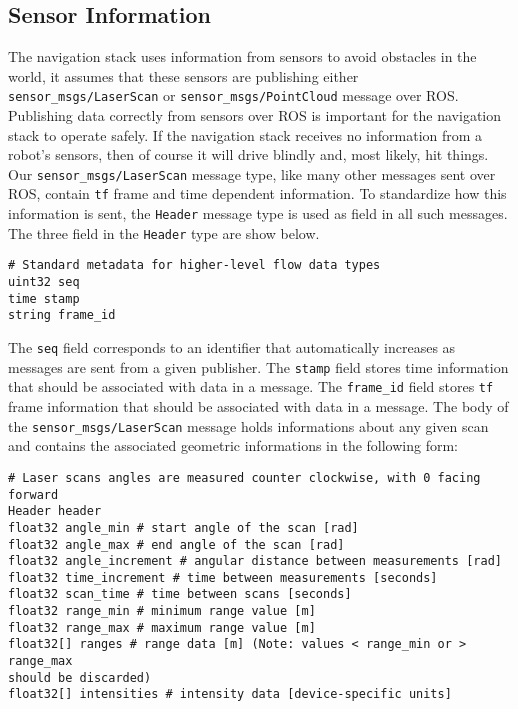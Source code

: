 \subsection*{Sensor Information}
The navigation stack uses information from sensors to avoid obstacles in the world,
it assumes that these sensors are publishing either \texttt{sensor\_msgs/LaserScan}
or \texttt{sensor\_msgs/PointCloud} message over ROS.
Publishing data correctly from sensors over ROS is important for the
navigation stack to operate safely. If the navigation stack receives no information
from a robot’s sensors, then of course it will drive blindly and, most
likely, hit things.
Our \texttt{sensor\_msgs/LaserScan} message type, like many other messages sent 
over ROS, contain \texttt{tf} frame and time dependent information. To standardize 
how this information is sent, the \texttt{Header} message type is used as field
in all such messages.
The three field in the \texttt{Header} type are show below.
\begin{lstlisting}
# Standard metadata for higher-level flow data types
uint32 seq
time stamp
string frame_id
\end{lstlisting}
The \texttt{seq} field corresponds to an identifier that automatically increases
as messages are sent from a given publisher. The \texttt{stamp} field stores time 
information that should be associated with data in a message. The \texttt{frame\_id}
field stores \texttt{tf} frame information that should be associated with data 
in a message. 
The body of the \texttt{sensor\_msgs/LaserScan} message holds informations about 
any given scan and contains the associated geometric informations in the following
form:
\begin{lstlisting}
# Laser scans angles are measured counter clockwise, with 0 facing forward
Header header
float32 angle_min # start angle of the scan [rad]
float32 angle_max # end angle of the scan [rad]
float32 angle_increment # angular distance between measurements [rad]
float32 time_increment # time between measurements [seconds]
float32 scan_time # time between scans [seconds]
float32 range_min # minimum range value [m]
float32 range_max # maximum range value [m]
float32[] ranges # range data [m] (Note: values < range_min or > range_max
should be discarded)
float32[] intensities # intensity data [device-specific units]
\end{lstlisting}

